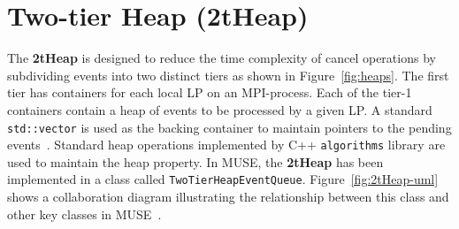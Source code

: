 \section{Two-tier Heap (2tHeap)} 
The \textbf{2tHeap} is designed to reduce the time complexity of cancel operations by subdividing events into two distinct tiers as shown in Figure~\ref{fig:heaps}. The first tier has containers for each local LP on an MPI-process. Each of the tier-1 containers contain a heap of events to be processed by a given LP.  A standard \texttt{std::vector} is used as the backing container to maintain pointers to the pending events~\cite{higiro2017multi}. Standard heap operations implemented by C++ \texttt{algorithms} library are used to maintain the heap property. In MUSE, the \textbf{2tHeap} has been implemented in a class called \texttt{TwoTierHeapEventQueue}.  Figure~\ref{fig:2tHeap-uml} shows a collaboration diagram illustrating the relationship between this class and other key classes in MUSE~\cite{gebre-2009}.

